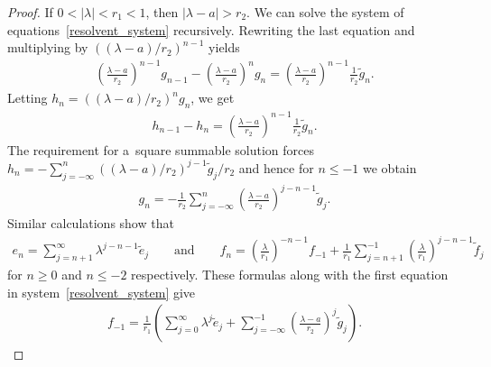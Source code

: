 \documentclass[11pt]{article}
\numberwithin{equation}{section}
\begin{document}
\begin{proof}
If $0<|\lambda|<r_1<1$, then $|\lambda-a|>r_2$.
We can solve the system of equations~\eqref{resolvent_system} recursively.
Rewriting the last equation and multiplying by $((\lambda-a)/r_2)^{n-1}$ yields
\begin{gather*}
\left(\frac{\lambda-a}{r_2}\right)^{n-1}g_{n-1}-\left(\frac{\lambda-a}{r_2}\right)^ng_n
=\left(\frac{\lambda-a}{r_2}\right)^{n-1}\frac{1}{r_2}\tilde{g}_n.
\end{gather*}
Letting $h_n=((\lambda-a)/r_2)^ng_n$, we get
\begin{gather*}
h_{n-1}-h_n=\left(\frac{\lambda-a}{r_2}\right)^{n-1}\frac{1}{r_2}\tilde{g}_n.
\end{gather*}
The requirement for a~square summable solution forces $h_n =
-\sum\limits_{j=-\infty}^n((\lambda-a)/r_2)^{j-1}\tilde{g}_j/r_2$ and hence for $n\le-1$ we obtain
\begin{gather*}
g_n=-\frac{1}{r_2}\sum\limits_{j=-\infty}^n\left(\frac{\lambda-a}{r_2}\right)^{j-n-1}\tilde{g}_j.
\end{gather*}
Similar calculations show that
\begin{gather*}
e_n=\sum\limits_{j=n+1}^\infty \lambda^{j-n-1}\tilde{e}_j
\qquad
\text{and}
\qquad
f_n=\left(\frac{\lambda}{r_1}\right)^{-n-1}f_{-1}+\frac{1}{r_1}\sum\limits_{j=n+1}^{-1}\left(\frac{\lambda}{r_1}\right)^{j-n-1}\tilde{f}_j
\end{gather*}
for $n\ge0$ and $n\le-2$ respectively.
These formulas along with the f\/irst equation in system~\eqref{resolvent_system} give
\begin{gather*}
f_{-1}=\frac{1}{r_1}\left(\sum\limits_{j=0}^\infty\lambda^j\tilde{e}_j+\sum\limits_{j=-\infty}^{-1}\left(\frac{\lambda
- a}{r_2}\right)^j\tilde{g}_j\right).
\end{gather*}


\end{proof}
\end{document}
